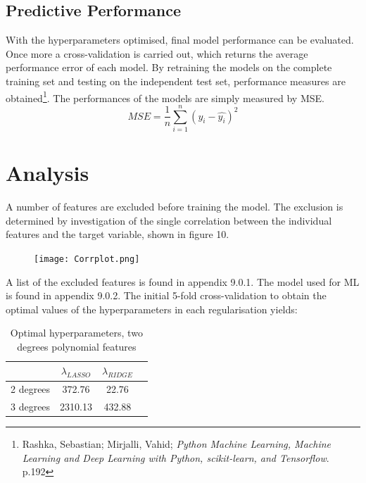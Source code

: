 \documentclass[12pt,a4paper]{article}
\begin{document}
\subsection{Predictive Performance}
With the hyperparameters optimised, final model performance can be evaluated. Once more a cross-validation is carried out, which returns the average performance error of each model. By retraining the models on the complete training set and testing on the independent test set, performance measures are obtained\footnote{Rashka, Sebastian; Mirjalli, Vahid; \textit{Python Machine Learning, Machine Learning and Deep Learning with Python, scikit-learn, and Tensorflow}. p.192}. \newline The performances of the models are simply measured by MSE. \newline
$$ MSE = \frac{1}{n}\sum_{i=1}^{n}(y_i-\hat{y_i})^2$$



\section{Analysis}
A number of features are excluded before training the model. The exclusion is determined by investigation of the single correlation between the  individual features and the target variable, shown in figure 10.
\begin{figure}[H]
\centering
\caption{}
\texttt{[image: Corrplot.png]}
\end{figure}

A list of the excluded features is found in appendix 9.0.1. The model used for ML is found in appendix 9.0.2.  
The initial 5-fold cross-validation to obtain the optimal values of the hyperparameters in each regularisation yields: 
\begin{table}[H]
\begin{center}
\caption{Optimal hyperparameters, two degrees polynomial features\label{time}}
\begin{tabular}{ c | c  c  c } 
  & $\lambda_{LASSO}$ & $\lambda_{RIDGE}$ \\ \hline
2 degrees  & 372.76 & 22.76 \\ \hline
3 degrees  & 2310.13 & 432.88
\end{tabular}
\end{center}
\end{table} 
\end{document}
